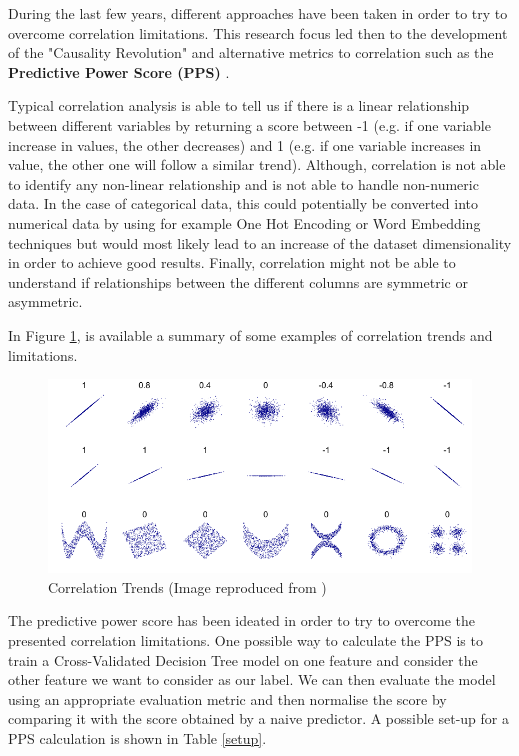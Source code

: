 \begin{appendices}
During the last few years, different approaches have been taken in order to try to overcome correlation limitations. This research focus led then to the development of the "Causality Revolution" and alternative metrics to correlation such as the \textbf{Predictive Power Score (PPS)} \cite{ppc}.

Typical correlation analysis is able to tell us if there is a linear relationship between different variables by returning a score between -1 (e.g. if one variable increase in values, the other decreases) and 1 (e.g. if one variable increases in value, the other one will follow a similar trend). Although, correlation is not able to identify any non-linear relationship and is not able to handle non-numeric data. In the case of categorical data, this could potentially be converted into numerical data by using for example One Hot Encoding or Word Embedding techniques but would most likely lead to an increase of the dataset dimensionality in order to achieve good results. Finally, correlation might not be able to understand if relationships between the different columns are symmetric or asymmetric.

In Figure \ref{corr_t}, is available a summary of some examples of correlation trends and limitations.

\vspace{-0.1cm}
\begin{figure}[ht!]%
    \centering
    \includegraphics[width=0.85\linewidth]{latex/images/corr.pdf}
    \vspace{-0.2cm}
    \caption{Correlation Trends (Image reproduced from \cite{corr_trends})}
    \label{corr_t}
\end{figure}
\vspace{-0.5cm}

The predictive power score has been ideated in order to try to overcome the presented correlation limitations. One possible way to calculate the PPS is to train a Cross-Validated Decision Tree model on one feature and consider the other feature we want to consider as our label. We can then evaluate the model using an appropriate evaluation metric and then normalise the score by comparing it with the score obtained by a naive predictor. A possible set-up for a PPS calculation is shown in Table \ref{setup}.


\end{appendices}

